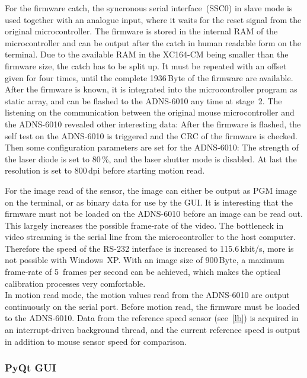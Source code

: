 \documentclass[12pt,a4paper]{article}
\begin{document}
For the firmware catch, the syncronous serial interface~(SSC0) in slave mode is used together with an analogue input, where it waits for the reset signal from the original microcontroller.
The firmware is stored in the internal RAM of the microcontroller and can be output after the catch in human readable form on the terminal.
Due to the available RAM in the XC164-CM being smaller than the firmware size, the catch has to be split up.
It must be repeated with an offset given for four times, until the complete 1936\,Byte of the firmware are available.
After the firmware is known, it is integrated into the microcontroller program as static array, and can be flashed to the ADNS-6010 any time at stage~2.
The listening on the communication between the original mouse microcontroller and the ADNS-6010 revealed other interesting data:
After the firmware is flashed, the self test on the ADNS-6010 is triggered and the CRC of the firmware is checked.
Then some configuration parameters are set for the ADNS-6010:
The strength of the laser diode is set to 80\,\%, and the laser shutter mode is disabled. 
At last the resolution is set to 800\,dpi before starting motion read.

For the image read of the sensor, the image can either be output as PGM image on the terminal, or as binary data for use by the GUI.
It is interesting that the firmware must not be loaded on the ADNS-6010 before an image can be read out.
This largely increases the possible frame-rate of the video.
The bottleneck in video streaming is the serial line from the microcontroller to the host computer.
Therefore the speed of the RS-232 interface is increased to 115.6\,kbit/s, more is not possible with Windows~XP.
With an image size of 900\,Byte, a maximum frame-rate of 5~frames per second can be achieved, which makes the optical calibration processes very comfortable.\\
In motion read mode, the motion values read from the ADNS-6010 are output continuously on the serial port.
Before motion read, the firmware must be loaded to the ADNS-6010.
Data from the reference speed sensor (see~\autoref{lb}) is acquired in an interrupt-driven background thread, and the current reference speed is output in addition to mouse sensor speed for comparison.

\subsubsection{PyQt GUI}
\label{sec:pyqtgui}
\end{document}
